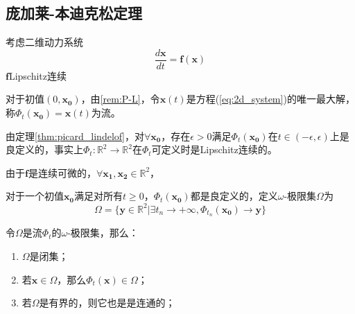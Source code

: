 \subsection{庞加莱-本迪克松定理}
考虑二维动力系统
\begin{equation}\label{eq:2d_system}
    \frac{d\mathbf{x}}{dt}=\mathbf{f}(\mathbf{x})
\end{equation}
$\mathbf{f}$Lipschitz连续
\begin{defn}[流]
    对于初值$(0,\mathbf{x_0})$，由\ref{rem:P-L}，令$\mathbf{x}(t)$是方程(\ref{eq:2d_system})的唯一最大解，称$\Phi_t(\mathbf{x_0})=\mathbf{x}(t)$为流。
\end{defn}
\begin{rem}
    由定理\ref{thm:picard_lindelof}，对$\forall \mathbf{x_0}$，存在$\epsilon>0$满足$\Phi_t(\mathbf{x_0})$在$t\in (-\epsilon,\epsilon)$上是良定义的，事实上$\Phi_t:\mathbb{R}^2\to\mathbb{R}^2$在$\Phi_t$可定义时是Lipschitz连续的。
\end{rem}
\begin{pf}
    由于$\mathbf{f}$是连续可微的，$\forall \mathbf{x_1},\mathbf{x_2}\in \mathbb{R}^2$，
\end{pf}
\begin{defn}
    对于一个初值$\mathbf{x_0}$满足对所有$t\geq 0$，$\Phi_t(\mathbf{x_0})$都是良定义的，定义$\omega$-极限集$\Omega$为
    \begin{equation}
        \Omega=\{\mathbf{y}\in \mathbb{R}^2|\exists t_n\to +\infty,\Phi_{t_n}(\mathbf{x_0})\to \mathbf{y}\}
    \end{equation}
\end{defn}
\begin{prop}
    令$\Omega$是流$\Phi_t$的$\omega$-极限集，那么：
    \begin{enumerate}
        \item $\Omega$是闭集；
        \item 若$\mathbf{x}\in \Omega$，那么$\Phi_t(\mathbf{x})\in \Omega$；
        \item 若$\Omega$是有界的，则它也是是连通的；
    \end{enumerate}
\end{prop}

